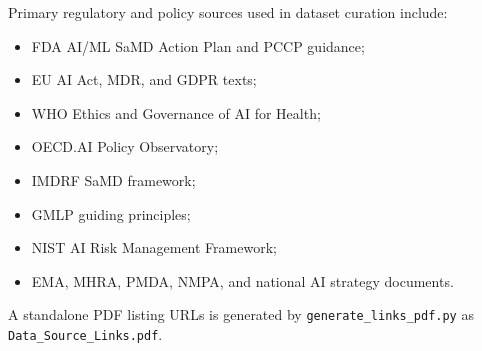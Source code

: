 \documentclass[12pt,a4paper]{report}
\begin{document}
Primary regulatory and policy sources used in dataset curation include:
\begin{itemize}[noitemsep]
  \item FDA AI/ML SaMD Action Plan and PCCP guidance;
  \item EU AI Act, MDR, and GDPR texts;
  \item WHO Ethics and Governance of AI for Health;
  \item OECD.AI Policy Observatory;
  \item IMDRF SaMD framework;
  \item GMLP guiding principles;
  \item NIST AI Risk Management Framework;
  \item EMA, MHRA, PMDA, NMPA, and national AI strategy documents.
\end{itemize}

A standalone PDF listing URLs is generated by \texttt{generate\_links\_pdf.py} as \texttt{Data\_Source\_Links.pdf}.

\printbibliography[heading=bibintoc,title={References}]
\end{document}
